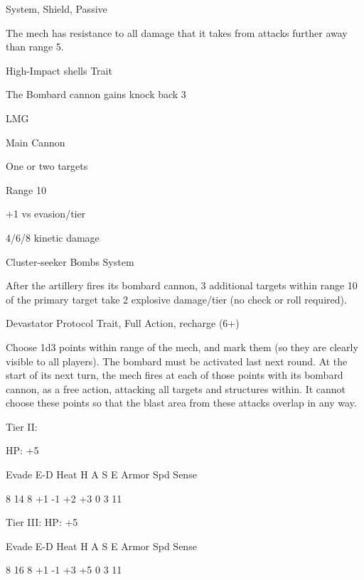 System, Shield, Passive
 
The mech has resistance to all damage that it takes from attacks further away than range 5.
 

High-Impact shells  
Trait
 
The Bombard cannon gains knock back 3
 

LMG
 
Main Cannon
 
One or two targets
 
Range 10
 
+1 vs evasion/tier
 
4/6/8 kinetic damage
 

Cluster-seeker Bombs  
System
 
After the artillery fires its bombard cannon, 3 additional targets within range 10 of the primary  
target take 2 explosive damage/tier (no check or roll required).
 

Devastator Protocol  
Trait, Full Action, recharge (6+)
 
Choose 1d3 points within range of the mech, and mark them (so they are clearly visible to all  
players). The bombard must be activated last next round. At the start of its next turn, the mech  
fires at each of those points with its bombard cannon, as a free action, attacking all targets and  
structures within. It cannot choose these points so that the blast area from these attacks overlap  
in any way.
 

Tier II:
 
HP: +5
 

          Evade    E-D    Heat     H    A     S     E       Armor        Spd      Sense 

          8        14     8        +1   -1    +2    +3      0            3        11 

Tier III:  
HP: +5
 

          Evade    E-D    Heat     H    A     S     E       Armor        Spd      Sense 

          8        16     8        +1   -1    +3    +5      0            3        11 
